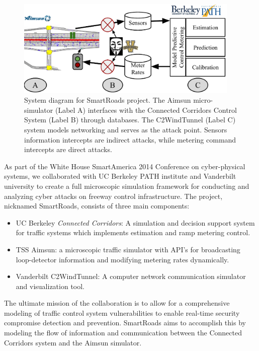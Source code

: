 \begin{figure}[t]
    \centering
    \includegraphics[width=0.95\textwidth]{diagrams/smart-roads}
    \caption{System diagram for SmartRoads project. The Aimsun micro-simulator (Label A) interfaces with the Connected Corridors Control System (Label B) through databases. The C2WindTunnel (Label C) system models networking and serves as the attack point. Sensors information intercepts are indirect attacks, while metering command intercepts are direct attacks.}
    \label{fig:smart-roads-truck}
\end{figure}

As part of the White House SmartAmerica 2014 Conference on cyber-physical systems, we collaborated with UC Berkeley PATH institute and Vanderbilt university to create a full microscopic simulation framework for conducting and analyzing cyber attacks on freeway control infrastructure. The project, nicknamed SmartRoads, consists of three main components:

\begin{itemize}
    \item UC Berkeley \emph{Connected Corridors}: A simulation and decision support system for traffic systems which implements estimation and ramp metering control.
    \item TSS Aimsun: a microscopic traffic simulator with API's for broadcasting loop-detector information and modifying metering rates dynamically.
    \item Vanderbilt C2WindTunnel: A computer network communication simulator and visualization tool.
\end{itemize}

The ultimate mission of the collaboration is to allow for a comprehensive modeling of traffic control system vulnerabilities to enable real-time security compromise detection and prevention. SmartRoads aims to accomplish this by modeling the flow of information and communication between the Connected Corridors system and the Aimsun simulator.

